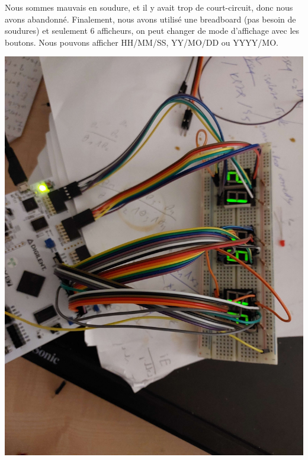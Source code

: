 \documentclass{beamer}
\begin{document}
\begin{frame}
    Nous sommes mauvais en soudure, et il y avait trop de court-circuit, donc nous avons abandonné.
    Finalement, nous avons utilisé une breadboard (pas besoin de soudures) et seulement 6 afficheurs,
    on peut changer de mode d'affichage avec les boutons. Nous pouvons afficher HH/MM/SS, YY/MO/DD
    ou YYYY/MO.
    \begin{center}
        \includegraphics[angle=90,scale=0.04]{pictures/FPGA final.jpg}
    \end{center}
\end{frame}
\end{document}
